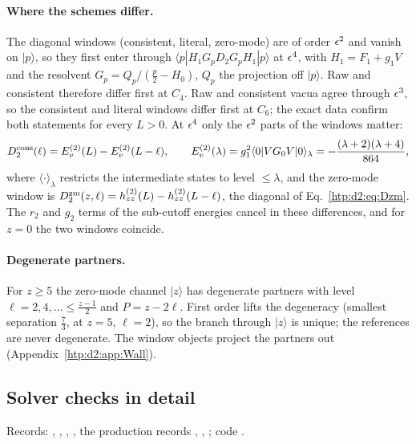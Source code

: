 \paragraph{Where the schemes differ.} The diagonal windows (consistent, literal, zero-mode) are of order $\epsilon^2$ and
vanish on $|p\rangle$, so they first enter through $\langle p|H_1G_pD_2G_pH_1|p\rangle$ at $\epsilon^4$, with $H_1=F_1+g_1V$ and the resolvent
$G_p=Q_p/(\frac p2-H_0)$, $Q_p$ the projection off $|p\rangle$. Raw and consistent therefore differ first at $C_4$. Raw
and consistent vacua agree through $\epsilon^3$, so the consistent and literal windows differ first at $C_6$; the exact data
confirm both statements for every $L>0$. At $\epsilon^4$ only the $\epsilon^2$ parts of the windows matter:
\begin{equation}
 D^{\rm cons}_2(\ell)=E_v^{(2)}(L)-E_v^{(2)}(L-\ell),\qquad
 E_v^{(2)}(\lambda)=g_1^2\langle0|VG_0V|0\rangle_\lambda=-\frac{(\lambda+2)(\lambda+4)}{864},
 \label{htp:d2:eq:Ev2}
\end{equation}
where $\langle\cdot\rangle_\lambda$ restricts the intermediate states to level $\le\lambda$, and the zero-mode window is
$D_2^{\rm zm}(z,\ell)=h^{(2)}_{zz}(L)-h^{(2)}_{zz}(L-\ell)$, the diagonal of Eq.~\eqref{htp:d2:eq:Dzm}. The $r_2$ and $g_2$ terms of
the sub-cutoff energies cancel in these differences, and for $z=0$ the two windows coincide.

\paragraph{Degenerate partners.} For $z\ge5$ the zero-mode channel $|z\rangle$ has degenerate partners with level
$\ell=2,4,\dots\le\frac{z-1}2$ and $P=z-2\ell$. First order lifts the degeneracy (smallest separation $\frac73$, at $z=5$,
$\ell=2$), so the branch through $|z\rangle$ is unique; the references are never degenerate. The window objects project
the partners out (Appendix~\ref{htp:d2:app:Wall}).

\subsection{Solver checks in detail}\label{htp:d2:app:checks}
{\small\raggedright\noindent Records: , , ,
, the production records , , ; code
.\par}

